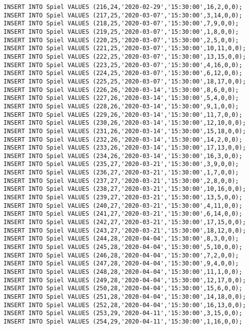 \documentclass{lehramt-informatik-aufgabe}
\begin{document}
\begin{verbatim}
INSERT INTO Spiel VALUES (216,24,'2020-02-29','15:30:00',16,2,0,0);
INSERT INTO Spiel VALUES (217,25,'2020-03-07','15:30:00',3,14,0,0);
INSERT INTO Spiel VALUES (218,25,'2020-03-07','15:30:00',7,9,0,0);
INSERT INTO Spiel VALUES (219,25,'2020-03-07','15:30:00',1,8,0,0);
INSERT INTO Spiel VALUES (220,25,'2020-03-07','15:30:00',2,5,0,0);
INSERT INTO Spiel VALUES (221,25,'2020-03-07','15:30:00',10,11,0,0);
INSERT INTO Spiel VALUES (222,25,'2020-03-07','15:30:00',13,15,0,0);
INSERT INTO Spiel VALUES (223,25,'2020-03-07','15:30:00',4,16,0,0);
INSERT INTO Spiel VALUES (224,25,'2020-03-07','15:30:00',6,12,0,0);
INSERT INTO Spiel VALUES (225,25,'2020-03-07','15:30:00',18,17,0,0);
INSERT INTO Spiel VALUES (226,26,'2020-03-14','15:30:00',8,6,0,0);
INSERT INTO Spiel VALUES (227,26,'2020-03-14','15:30:00',5,4,0,0);
INSERT INTO Spiel VALUES (228,26,'2020-03-14','15:30:00',9,1,0,0);
INSERT INTO Spiel VALUES (229,26,'2020-03-14','15:30:00',11,7,0,0);
INSERT INTO Spiel VALUES (230,26,'2020-03-14','15:30:00',12,10,0,0);
INSERT INTO Spiel VALUES (231,26,'2020-03-14','15:30:00',15,18,0,0);
INSERT INTO Spiel VALUES (232,26,'2020-03-14','15:30:00',14,2,0,0);
INSERT INTO Spiel VALUES (233,26,'2020-03-14','15:30:00',17,13,0,0);
INSERT INTO Spiel VALUES (234,26,'2020-03-14','15:30:00',16,3,0,0);
INSERT INTO Spiel VALUES (235,27,'2020-03-21','15:30:00',3,9,0,0);
INSERT INTO Spiel VALUES (236,27,'2020-03-21','15:30:00',1,7,0,0);
INSERT INTO Spiel VALUES (237,27,'2020-03-21','15:30:00',2,8,0,0);
INSERT INTO Spiel VALUES (238,27,'2020-03-21','15:30:00',10,16,0,0);
INSERT INTO Spiel VALUES (239,27,'2020-03-21','15:30:00',13,5,0,0);
INSERT INTO Spiel VALUES (240,27,'2020-03-21','15:30:00',4,11,0,0);
INSERT INTO Spiel VALUES (241,27,'2020-03-21','15:30:00',6,14,0,0);
INSERT INTO Spiel VALUES (242,27,'2020-03-21','15:30:00',17,15,0,0);
INSERT INTO Spiel VALUES (243,27,'2020-03-21','15:30:00',18,12,0,0);
INSERT INTO Spiel VALUES (244,28,'2020-04-04','15:30:00',8,3,0,0);
INSERT INTO Spiel VALUES (245,28,'2020-04-04','15:30:00',5,10,0,0);
INSERT INTO Spiel VALUES (246,28,'2020-04-04','15:30:00',7,2,0,0);
INSERT INTO Spiel VALUES (247,28,'2020-04-04','15:30:00',9,4,0,0);
INSERT INTO Spiel VALUES (248,28,'2020-04-04','15:30:00',11,1,0,0);
INSERT INTO Spiel VALUES (249,28,'2020-04-04','15:30:00',12,17,0,0);
INSERT INTO Spiel VALUES (250,28,'2020-04-04','15:30:00',15,6,0,0);
INSERT INTO Spiel VALUES (251,28,'2020-04-04','15:30:00',14,18,0,0);
INSERT INTO Spiel VALUES (252,28,'2020-04-04','15:30:00',16,13,0,0);
INSERT INTO Spiel VALUES (253,29,'2020-04-11','15:30:00',3,15,0,0);
INSERT INTO Spiel VALUES (254,29,'2020-04-11','15:30:00',1,16,0,0);

\end{verbatim}
\end{document}
